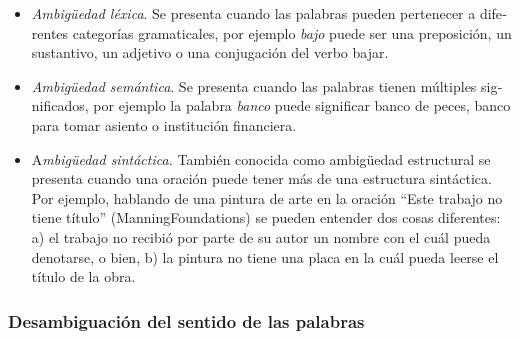 \documentclass[letterpaper]{article}
\newcommand\textstylebibuscitbase[1]{#1}
\newcommand\liststyleLx{%
\renewcommand\labelitemi{{\textbullet}}
\renewcommand\labelitemii{${\circ}$}
\renewcommand\labelitemiii{${\blacksquare}$}
\renewcommand\labelitemiv{{\textbullet}}
}
\begin{document}
\liststyleLx
\begin{itemize}
\item {\sffamily
\textstylebibuscitbase{\foreignlanguage{spanish}{\textit{Ambig\"uedad
l\'exica}}}\textstylebibuscitbase{\foreignlanguage{spanish}{. Se
presenta cuando las palabras pueden pertenecer
}}\textstylebibuscitbase{\foreignlanguage{spanish}{a diferentes
categor\'ias gramaticales, por ejemplo
}}\textstylebibuscitbase{\foreignlanguage{spanish}{\textit{bajo}}}\textstylebibuscitbase{\foreignlanguage{spanish}{
puede ser una preposici\'on, un sustantivo, un adjetivo o una
conjugaci\'on del verbo bajar. }}}
\item {\sffamily
\textstylebibuscitbase{\foreignlanguage{spanish}{\textit{Ambig\"uedad
sem\'antica}}}\textstylebibuscitbase{\foreignlanguage{spanish}{. Se
presenta cuando las palabras tienen m\'ultiples significados, por
ejemplo la palabra
}}\textstylebibuscitbase{\foreignlanguage{spanish}{\textit{banco}}}\textstylebibuscitbase{\foreignlanguage{spanish}{
puede significar banco de peces, banco para tomar asiento o
instituci\'on financiera. }}}
\item {\sffamily
\textstylebibuscitbase{\foreignlanguage{spanish}{A}}\textstylebibuscitbase{\foreignlanguage{spanish}{\textit{mbig\"uedad
sint\'actica.}}}\textstylebibuscitbase{\foreignlanguage{spanish}{
Tambi\'en conocida como ambig\"uedad estructural se presenta cuando una
oraci\'on puede tener m\'as de una estructura
}}\textstylebibuscitbase{\foreignlanguage{spanish}{sint\'actica. Por
ejemplo, hablando de una pintura de arte en la oraci\'on
}}\textstylebibuscitbase{\foreignlanguage{spanish}{{\textquotedblleft}Este
trabajo no tiene t\'itulo{\textquotedblright}
}}\textstylebibuscitbase{\foreignlanguage{spanish}{(ManningFoundations)}}\textstylebibuscitbase{\foreignlanguage{spanish}{
se pueden entender dos cosas diferentes: a) el trabajo no recibi\'o por
parte de su autor un nombre con el cu\'al pueda denotarse, o bien, b)
la pintura no tiene una placa en la cu\'al pueda leerse el t\'itulo de
la obra.}}}


\bigskip
\end{itemize}
\subsubsection[Desambiguaci\'on del sentido de las
palabras]{Desambiguaci\'on del sentido de las palabras}
\hypertarget{RefHeading10784782078703}{}
\bigskip
\end{document}
